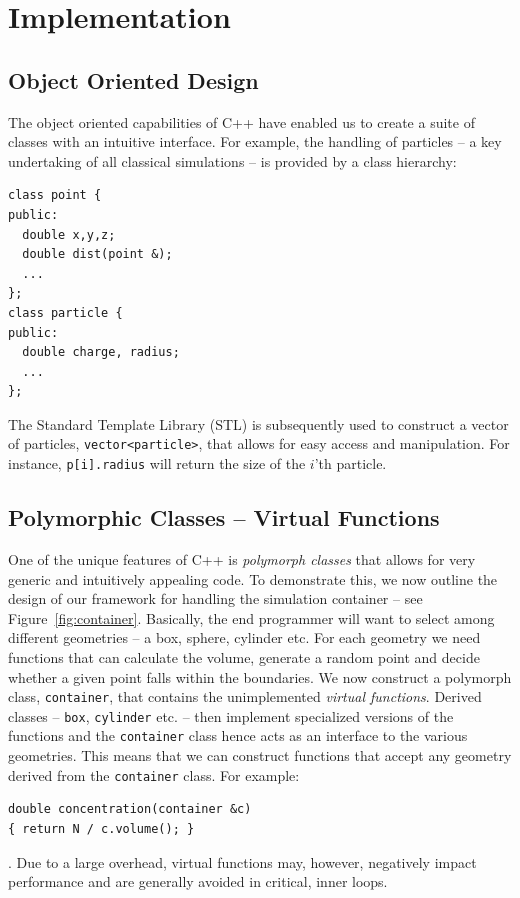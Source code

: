\documentclass[10pt]{bmc_article}
\newenvironment{bmcformat}{\fussy\setboolean{publ}{true}}{\fussy}
\begin{document}
\begin{bmcformat}
%
\section*{Implementation}
\subsection*{Object Oriented Design}
The object oriented capabilities of C++ have enabled us to create a suite of classes with an intuitive interface.
For example, the handling of particles -- a key undertaking of all classical simulations -- is provided by a class hierarchy:
\begin{verbatim}
class point {
public:
  double x,y,z;
  double dist(point &);
  ...
};
class particle {
public:
  double charge, radius;
  ...
};
\end{verbatim}
The Standard Template Library (STL) is subsequently used to construct a vector of particles, \verb"vector<particle>", that allows for easy access and manipulation.
For instance, \verb"p[i].radius" will return the size of the $i$'th particle.

\subsection*{Polymorphic Classes -- Virtual Functions}
One of the unique features of C++ is \emph{polymorph classes} that allows for very generic and intuitively appealing code.
To demonstrate this, we now outline the design of our framework for handling the simulation container -- see Figure~\ref{fig:container}.
Basically, the end programmer will want to select among different geometries -- a box, sphere, cylinder etc.
For each geometry we need functions that can calculate the volume, generate a random point and decide whether a given point falls within the boundaries.
We now construct a polymorph class, \verb"container", that contains the unimplemented \emph{virtual functions}.
Derived classes -- \verb"box", \verb"cylinder" etc. -- then implement specialized versions of the functions and the \verb"container" class hence acts as an interface to the various geometries.
This means that we can construct functions that accept any geometry derived from the \verb"container" class.
For example:
\begin{verbatim}
double concentration(container &c)
{ return N / c.volume(); }
\end{verbatim}.
Due to a large overhead, virtual functions may, however, negatively impact performance and are generally avoided in critical, inner loops.


\end{bmcformat}
\end{document}
